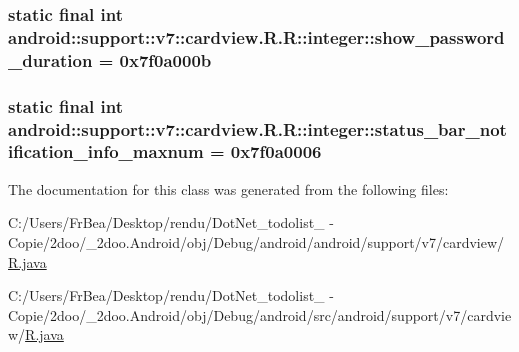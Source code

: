 \hypertarget{classandroid_1_1support_1_1v7_1_1cardview_1_1_r_1_1integer_0a73d0a284ef185aa24cbeb5ed2007e9}{
\subsubsection[{show\_\-password\_\-duration}]{\setlength{\rightskip}{0pt plus 5cm}static final int android::support::v7::cardview.R.R::integer::show\_\-password\_\-duration = 0x7f0a000b}}
\label{classandroid_1_1support_1_1v7_1_1cardview_1_1_r_1_1integer_0a73d0a284ef185aa24cbeb5ed2007e9}


\hypertarget{classandroid_1_1support_1_1v7_1_1cardview_1_1_r_1_1integer_b2f22fbda7a58594cf1aa51d0bfa918c}{
\subsubsection[{status\_\-bar\_\-notification\_\-info\_\-maxnum}]{\setlength{\rightskip}{0pt plus 5cm}static final int android::support::v7::cardview.R.R::integer::status\_\-bar\_\-notification\_\-info\_\-maxnum = 0x7f0a0006}}
\label{classandroid_1_1support_1_1v7_1_1cardview_1_1_r_1_1integer_b2f22fbda7a58594cf1aa51d0bfa918c}




The documentation for this class was generated from the following files:\begin{CompactItemize}
\item 
C:/Users/FrBea/Desktop/rendu/DotNet\_\-todolist\_ - Copie/2doo/\_\-2doo.Android/obj/Debug/android/android/support/v7/cardview/\hyperlink{android_2support_2v7_2cardview_2_r_8java}{R.java}\item 
C:/Users/FrBea/Desktop/rendu/DotNet\_\-todolist\_ - Copie/2doo/\_\-2doo.Android/obj/Debug/android/src/android/support/v7/cardview/\hyperlink{src_2android_2support_2v7_2cardview_2_r_8java}{R.java}\end{CompactItemize}
